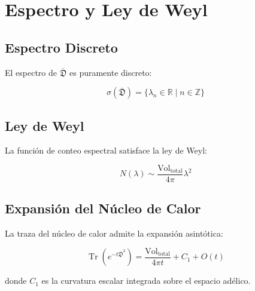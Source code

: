 \chapter{Espectro y Ley de Weyl}

\section{Espectro Discreto}

El espectro de $\overline{\mathfrak{D}}$ es puramente discreto:

\[
\sigma(\overline{\mathfrak{D}}) = \{ \lambda_n \in \mathbb{R} \mid n \in \mathbb{Z} \}
\]

\section{Ley de Weyl}

La función de conteo espectral satisface la ley de Weyl:

\[
N(\lambda) \sim \frac{\text{Vol}_{\text{total}}}{4\pi} \lambda^2
\]

\section{Expansión del Núcleo de Calor}

La traza del núcleo de calor admite la expansión asintótica:

\[
\operatorname{Tr}(e^{-t\overline{\mathfrak{D}}^2}) = \frac{\text{Vol}_{\text{total}}}{4\pi t} + C_1 + O(t)
\]

donde $C_1$ es la curvatura escalar integrada sobre el espacio adélico.
